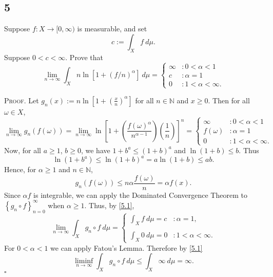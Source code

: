 \documentclass[12pt]{article}
\newcounter{ProofCounter}
\newenvironment{Proof}{\stepcounter{ProofCounter}\textsc{Proof.}}{\hfill$\square$}
\begin{document}
\newpage
\subsection*{5}
\begin{tcolorbox}
Suppose $f : X \rightarrow [0, \infty)$ is measurable, and set 
\[ c := \int_{X}f\ d\mu. \]
Suppose $0 < c < \infty$. Prove that 
\[ \lim_{n\rightarrow\infty}\int_{X}n\ln[1 + (f/n)^{\alpha}]\ d\mu = \left\{ \begin{array}{cl}
\infty & : 0 < \alpha < 1 \\
c & : \alpha = 1 \\
0 & : 1 < \alpha < \infty.
\end{array} \right.
\]
\end{tcolorbox}



\begin{Proof}
Let $g_{n}(x) := n\ln\left[ 1 + \left( \frac{x}{n} \right)^{\alpha} \right]$ for all $n \in \mathbb{N}$ and $x \geq 0$. Then for all $\omega \in X$,
\begin{equation}
\lim_{n\rightarrow\infty}g_{n}(f(\omega)) = \lim_{n\rightarrow\infty}\ln\left[ 1 + \left( \frac{f(\omega)^{\alpha}}{n^{\alpha - 1}} \right)\left( \frac{1}{n} \right)
 \right]^{n} = \left\{ \begin{array}{cl}
\infty & : 0 < \alpha < 1 \\
f(\omega) & : \alpha = 1 \\
0 & : 1 < \alpha < \infty.
\end{array} \right.
\label{5.1}
\end{equation}
Now, for all $a \geq 1$, $b \geq 0$, we have $1 + b^{a} \leq (1 + b)^{a}$ and $\ln(1 + b) \leq b$. Thus 
\[ \ln(1 + b^{a}) \leq \ln(1 + b)^{a} = a \ln(1 + b) \leq a b. \]
Hence, for $\alpha \geq 1$ and $n \in \mathbb{N}$,
\[ g_{n}(f(\omega)) \leq n\alpha\frac{f(\omega)}{n} = \alpha f(x). \]
Since $\alpha f$ is integrable, we can apply the Dominated Convergence Theorem to $\left\{ g_{n}\circ f \right\}_{n=0}^{\infty}$ when $\alpha \geq 1$. 
Thus, by \eqref{5.1},
\[ \lim_{n\rightarrow\infty}\int_{X}g_{n}\circ f\ d\mu = \left\{\begin{array}{ll}
\int_{X}f\ d\mu = c & : \alpha = 1,\\ \\
\int_{X}0\ d\mu = 0 & : 1 < \alpha < \infty.
\end{array} \right.
\]
For $0 < \alpha < 1$ we can apply Fatou's Lemma. Therefore by \eqref{5.1} 
\[ \liminf_{n\rightarrow\infty}\int_{X}g_{n}\circ f\ d\mu \leq \int_{X}\infty\ d\mu = \infty. \]
\end{Proof}
\end{document}
